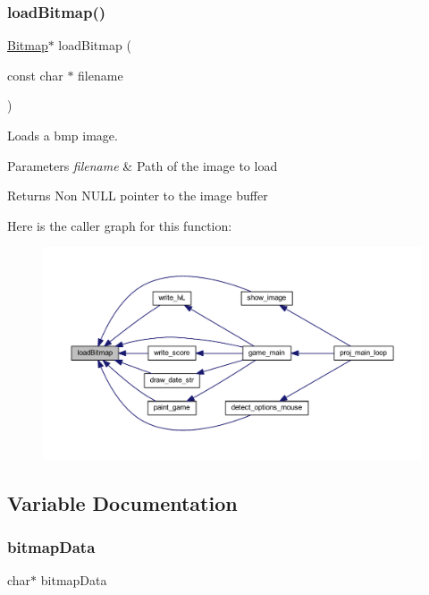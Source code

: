 \subsubsection{\texorpdfstring{load\+Bitmap()}{loadBitmap()}}
{\footnotesize\ttfamily \mbox{\hyperlink{struct_bitmap}{Bitmap}}$\ast$ load\+Bitmap (\begin{DoxyParamCaption}\item[{const char $\ast$}]{filename }\end{DoxyParamCaption})}



Loads a bmp image. 


\begin{DoxyParams}{Parameters}
{\em filename} & Path of the image to load \\
\hline
\end{DoxyParams}
\begin{DoxyReturn}{Returns}
Non N\+U\+LL pointer to the image buffer 
\end{DoxyReturn}
Here is the caller graph for this function\+:
\nopagebreak
\begin{figure}[H]
\begin{center}
\leavevmode
\includegraphics[width=350pt]{group__bitmap_ga3506880ffd407c36eb8aaddd2c1606d2_icgraph}
\end{center}
\end{figure}


\subsection{Variable Documentation}
\mbox{\label{group__bitmap_ga212b0ad51a5ac5d020dcf840678ef146}} 
\subsubsection{\texorpdfstring{bitmap\+Data}{bitmapData}}
{\footnotesize\ttfamily char$\ast$ bitmap\+Data}

